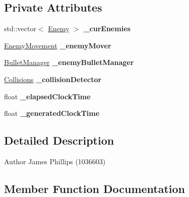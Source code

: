 \subsection*{Private Attributes}
\begin{DoxyCompactItemize}
\item 
\mbox{\label{class_enemy_manager_aa1907b3a1c7068e8feca0f8462ea8a6d}} 
std\+::vector$<$ \hyperlink{class_enemy}{Enemy} $>$ {\bfseries \+\_\+cur\+Enemies}
\item 
\mbox{\label{class_enemy_manager_ade1b38d513c67ab3d461639c1d7c7bad}} 
\hyperlink{class_enemy_movement}{Enemy\+Movement} {\bfseries \+\_\+enemy\+Mover}
\item 
\mbox{\label{class_enemy_manager_a10472fca1f8ea20212b47512ce22382e}} 
\hyperlink{class_bullet_manager}{Bullet\+Manager} {\bfseries \+\_\+enemy\+Bullet\+Manager}
\item 
\mbox{\label{class_enemy_manager_ab0dfb92601feacf2de9b92c2a11468bf}} 
\hyperlink{class_collisions}{Collisions} {\bfseries \+\_\+collision\+Detector}
\item 
\mbox{\label{class_enemy_manager_a3d77691b9f7e4af466de4eeb0982a7d0}} 
float {\bfseries \+\_\+elapsed\+Clock\+Time}
\item 
\mbox{\label{class_enemy_manager_acc7728a6a32d399ca416558f7b769090}} 
float {\bfseries \+\_\+generated\+Clock\+Time}
\end{DoxyCompactItemize}


\subsection{Detailed Description}
\begin{DoxyAuthor}{Author}
James Phillips (1036603) 
\end{DoxyAuthor}


\subsection{Member Function Documentation}
\mbox{\label{class_enemy_manager_a317b11ce52e67c7b760b2b81755fd95f}} 
